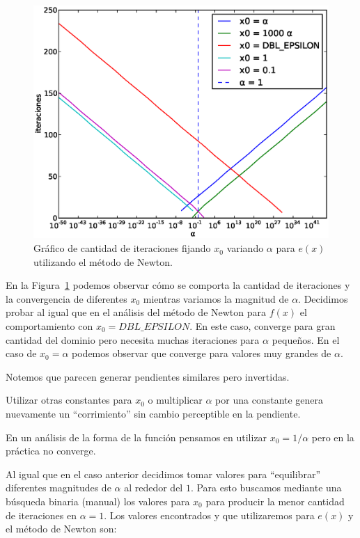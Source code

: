 \begin{figure}[!htbp]
  \begin{center}
    \includegraphics[scale=0.5]{graficos/new/e_newton_x0_fijo.eps}
    \caption{\label{fig:e_newton_x0_fijo} Gráfico de cantidad de iteraciones fijando $x_0$ variando $\alpha$ para $e(x)$ utilizando el método de Newton.}
  \end{center}
\end{figure}

En la Figura~\ref{fig:e_newton_x0_fijo} podemos observar cómo se comporta la
cantidad de iteraciones y la convergencia de diferentes $x_0$ mientras variamos
la magnitud de $\alpha$. Decidimos probar al igual que en el análisis del
método de Newton para $f(x)$ el comportamiento con $x_0 =
\textit{DBL\_EPSILON}$. En este caso, converge para gran cantidad del dominio
pero necesita muchas iteraciones para $\alpha$ pequeños. En el caso de $x_0 =
\alpha$ podemos observar que converge para valores muy grandes de $\alpha$.

Notemos que parecen generar pendientes similares pero invertidas.

Utilizar otras constantes para $x_0$ o multiplicar $\alpha$ por una constante
genera nuevamente un ``corrimiento'' sin cambio perceptible en la pendiente. 

En un análisis de la forma de la función pensamos en utilizar $x_0 = 1 /
\alpha$ pero en la práctica no converge.

Al igual que en el caso anterior decidimos tomar valores para ``equilibrar''
diferentes magnitudes de $\alpha$ al rededor del $1$. Para esto buscamos
mediante una búsqueda binaria (manual) los valores para $x_0$ para producir la
menor cantidad de iteraciones en $\alpha = 1$. Los valores encontrados y que
utilizaremos para $e(x)$ y el método de Newton son:

